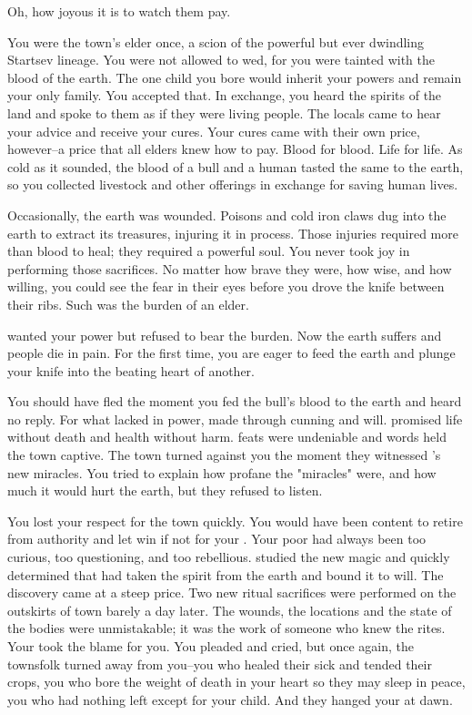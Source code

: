 \documentclass[char]{Pestilence}
\begin{document}
\name{\cShaman{}}

Oh, how joyous it is to watch them pay.

You were the town's elder once, a scion of the powerful but ever dwindling Startsev lineage. You were not allowed to wed, for you were tainted with the blood of the earth. The one child you bore would inherit your powers and remain your only family. You accepted that. In exchange, you heard the spirits of the land and spoke to them as if they were living people. The locals came to hear your advice and receive your cures. Your cures came with their own price, however--a price that all elders knew how to pay. Blood for blood. Life for life. As cold as it sounded, the blood of a bull and a human tasted the same to the earth, so you collected livestock and other offerings in exchange for saving human lives. 

Occasionally, the earth was wounded. Poisons and cold iron claws dug into the earth to extract its treasures, injuring it in process. Those injuries required more than blood to heal; they required a powerful soul. You never took joy in performing those sacrifices. No matter how brave they were, how wise, and how willing, you could see the fear in their eyes before you drove the knife between their ribs. Such was the burden of an elder. 

\cElder{\intro} wanted your power but refused to bear the burden. Now the earth suffers and \cElder{\their} people die in pain. For the first time, you are eager to feed the earth and plunge your knife into the beating heart of another.

You should have fled the moment you fed the bull's blood to the earth and heard no reply. For what \cElder{\they} lacked in power, \cElder{} made through cunning and will. \cElder{} promised life without death and health without harm. \cElder{\Their} feats were undeniable and \cElder{\their} words held the town captive. The town turned against you the moment they witnessed \cElder{}'s new miracles. You tried to explain how profane the "miracles" were, and how much it would hurt the earth, but they refused to listen. 

You lost your respect for the town quickly. You would have been content to retire from authority and let \cElder{} win if not for your \cPlaguebearer{\offspring}. Your poor \cPlaguebearer{} had always been too curious, too questioning, and too rebellious. \cPlaguebearer{\They} studied the new magic and quickly determined that \cElder{} had taken the spirit from the earth and bound it to \cElder{\their} will. The discovery came at a steep price. Two new ritual sacrifices were performed on the outskirts of town barely a day later. The wounds, the locations and the state of the bodies were unmistakable; it was the work of someone who knew the rites. Your \cPlaguebearer{\offspring} took the blame for you. You pleaded and cried, but once again, the townsfolk turned away from you--you who healed their sick and tended their crops, you who bore the weight of death in your heart so they may sleep in peace, you who had nothing left except for your child. And they hanged your \cPlaguebearer{} at dawn.
\end{document}
